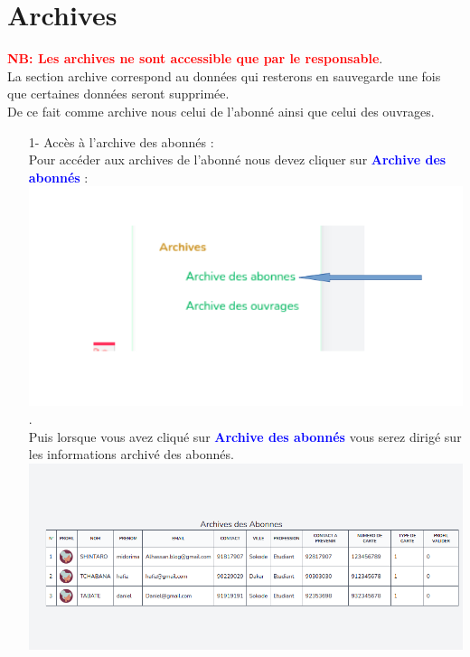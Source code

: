 \documentclass[12pt,a4paper]{article}
\begin{document}
\newpage
\section{Archives}
\textbf{\textcolor{red}{NB: Les archives ne sont accessible que par le responsable}}.\\
La section archive correspond au données qui resterons en sauvegarde une fois que certaines données seront supprimée.\\
De ce fait comme archive nous celui de l'abonné ainsi que celui des ouvrages.\\
\begin{itemize}
\item[1-]Accès à l'archive des abonnés : \\
Pour accéder aux archives de l'abonné nous devez cliquer sur \textbf{\textcolor{blue}{Archive des abonnés}} : \\
\includegraphics[scale=0.5]{end/archiveAbonne.png}.\\
Puis lorsque vous avez cliqué sur \textbf{\textcolor{blue}{Archive des abonnés}} vous serez dirigé sur les informations archivé des abonnés.\\
\includegraphics[scale=0.5]{end/InfoAbonne.png}
\end{itemize}
\end{document}
